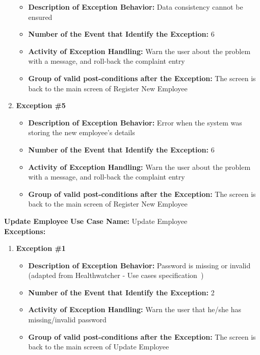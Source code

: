 \documentclass[11pt,twoside]{article}
\begin{document}
\begin{enumerate}
\begin{itemize}
  \item \textbf{Description of Exception Behavior:} Data consistency cannot be ensured
  \item \textbf{Number of the Event that Identify the Exception:} 6
  \item \textbf{Activity of Exception Handling:} Warn the user about the problem with a message, and roll-back the complaint entry
  \item \textbf{Group of valid post-conditions after the Exception:} The screen is back to the main screen of Register New Employee
 \end{itemize}
 \item \textbf{Exception \#5}
 \begin{itemize}
  \item \textbf{Description of Exception Behavior:} Error when the system was storing the new employee's details
  \item \textbf{Number of the Event that Identify the Exception:} 6
  \item \textbf{Activity of Exception Handling:} Warn the user about the problem with a message, and roll-back the complaint entry
  \item \textbf{Group of valid post-conditions after the Exception:} The screen is back to the main screen of Register New Employee
 \end{itemize}
\end{enumerate}

\textbf{Update Employee}
\textbf{Use Case Name:} Update Employee\\
\textbf{Exceptions:}
\begin{enumerate}
 \item \textbf{Exception \#1}
 \begin{itemize}
  \item \textbf{Description of Exception Behavior:} Password is missing or invalid (adapted from Healthwatcher - Use cases
specification~\cite{hw-usecase})
  \item \textbf{Number of the Event that Identify the Exception:} 2
  \item \textbf{Activity of Exception Handling:} Warn the user that he/she has missing/invalid password
  \item \textbf{Group of valid post-conditions after the Exception:} The screen is back to the main screen of Update Employee
 \end{itemize}
\end{enumerate}
\end{document}
